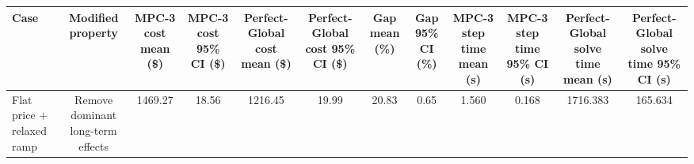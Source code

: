 \begin{tabular}{lccccccccccc}
\toprule
Case & Modified property & MPC-3 cost mean (\$) & MPC-3 cost 95\% CI (\$) & Perfect-Global cost mean (\$) & Perfect-Global cost 95\% CI (\$) & Gap mean (\%) & Gap 95\% CI (\%) & MPC-3 step time mean (s) & MPC-3 step time 95\% CI (s) & Perfect-Global solve time mean (s) & Perfect-Global solve time 95\% CI (s) \\
\midrule
Flat price + relaxed ramp & Remove dominant long-term effects & 1469.27 & 18.56 & 1216.45 & 19.99 & 20.83 & 0.65 & 1.560 & 0.168 & 1716.383 & 165.634 \\
\bottomrule
\end{tabular}
